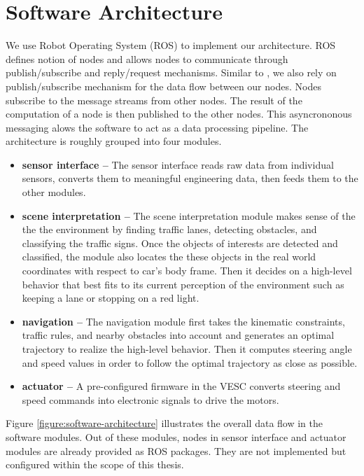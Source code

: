 \section{Software Architecture}

We use Robot Operating System (ROS) \cite{Quigley2009ROSAO} to implement our
architecture.  ROS defines notion of nodes and allows nodes to communicate
through publish/subscribe and reply/request mechanisms. Similar to
\cite{Montemerlo2009JuniorTS}, we also rely on publish/subscribe mechanism for
the data flow between our nodes.  Nodes subscribe to the message streams from
other nodes. The result of the computation of a node is then published to the
other nodes. This asyncrononous messaging alows the software to act as a data
processing pipeline. The architecture is roughly grouped into four modules.

\begin{itemize}
  \item \textbf{sensor interface --} The sensor interface reads raw data from
    individual sensors, converts them to meaningful engineering data, then
    feeds them to the other modules.
  \item \textbf{scene interpretation --} The scene interpretation module
    makes sense of the the the environment by finding traffic lanes,
    detecting obstacles, and classifying the traffic signs. Once the
    objects of interests are detected and classified, the module also
    locates the these objects in the real world coordinates with respect to
    car's body frame. Then it decides on a high-level behavior that best
    fits to its current perception of the environment such as keeping a
    lane or stopping on a red light.
  \item \textbf{navigation --} The navigation module first takes the
    kinematic constraints, traffic rules, and nearby obstacles into account
    and generates an optimal trajectory to realize the high-level behavior.
    Then it computes steering angle and speed values in order to follow the
    optimal trajectory as close as possible.
  \item \textbf{actuator --} A pre-configured firmware in the VESC converts
    steering and speed commands into electronic signals to drive the
    motors.
\end{itemize}

Figure \ref{figure:software-architecture} illustrates the overall data flow in
the software modules. Out of these modules, nodes in sensor interface and
actuator modules are already provided as ROS packages. They are not implemented
but configured within the scope of this thesis.

